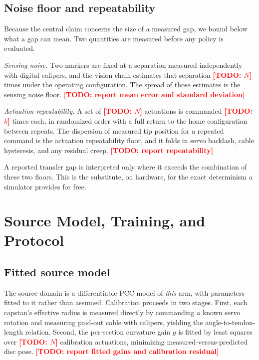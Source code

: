 \documentclass[letterpaper, 10pt, conference]{ieeeconf}
\newcommand{\todo}[1]{\textcolor{red}{\textbf{[TODO: #1]}}}
\begin{document}
\subsection{Noise floor and repeatability}
\label{sec:noise}

Because the central claim concerns the size of a measured gap, we bound
below what a gap can mean. Two quantities are measured before any policy is
evaluated.

\emph{Sensing noise.} Two markers are fixed at a separation measured
independently with digital calipers, and the vision chain estimates that
separation \todo{$N$} times under the operating configuration. The spread of
those estimates is the sensing noise floor.
\todo{report mean error and standard deviation}

\emph{Actuation repeatability.} A set of \todo{$N$} actuations is commanded
\todo{$k$} times each, in randomized order with a full return to the home
configuration between repeats. The dispersion of measured tip position for a
repeated command is the actuation repeatability floor, and it folds in servo
backlash, cable hysteresis, and any residual creep.
\todo{report repeatability}

A reported transfer gap is interpreted only where it exceeds the combination
of these two floors. This is the substitute, on hardware, for the exact
determinism a simulator provides for free.

\section{Source Model, Training, and Protocol}
\label{sec:protocol}

\subsection{Fitted source model}
\label{sec:calib}

The source domain is a differentiable PCC model of \emph{this} arm, with
parameters fitted to it rather than assumed. Calibration proceeds in two
stages. First, each capstan's effective radius is measured directly by
commanding a known servo rotation and measuring paid-out cable with calipers,
yielding the angle-to-tendon-length relation. Second, the per-section
curvature gain $g$ is fitted by least squares over \todo{$N$} calibration
actuations, minimizing measured-versus-predicted disc pose.
\todo{report fitted gains and calibration residual}
\end{document}
